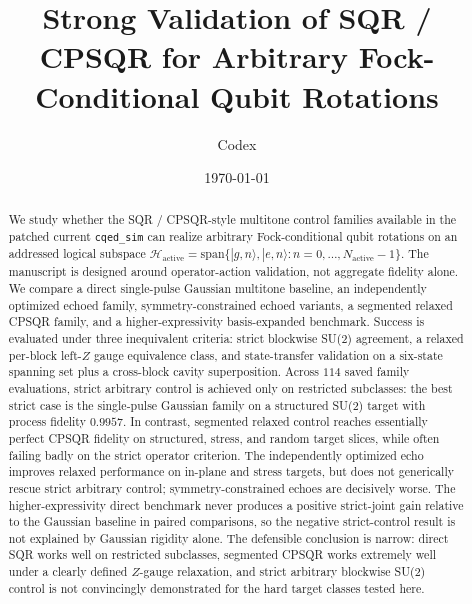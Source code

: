 \documentclass[aps,pra,twocolumn,reprint,floatfix,amsmath,amssymb]{revtex4-2}
\begin{document}
\title{Strong Validation of SQR / CPSQR for Arbitrary Fock-Conditional Qubit Rotations}
\author{Codex}
\date{\today}

\begin{abstract}
We study whether the SQR / CPSQR-style multitone control families available in the patched current \texttt{cqed\_sim} can realize arbitrary Fock-conditional qubit rotations on an addressed logical subspace
\(
\mathcal{H}_{\mathrm{active}}
=
\mathrm{span}\{ |g,n\rangle, |e,n\rangle : n=0,\dots,N_{\mathrm{active}}-1 \}.
\)
The manuscript is designed around operator-action validation, not aggregate fidelity alone.  We compare a direct single-pulse Gaussian multitone baseline, an independently optimized echoed family, symmetry-constrained echoed variants, a segmented relaxed CPSQR family, and a higher-expressivity basis-expanded benchmark.  Success is evaluated under three inequivalent criteria: strict blockwise SU(2) agreement, a relaxed per-block left-$Z$ gauge equivalence class, and state-transfer validation on a six-state spanning set plus a cross-block cavity superposition.  Across $114$ saved family evaluations, strict arbitrary control is achieved only on restricted subclasses: the best strict case is the single-pulse Gaussian family on a structured SU(2) target with process fidelity $0.9957$.  In contrast, segmented relaxed control reaches essentially perfect CPSQR fidelity on structured, stress, and random target slices, while often failing badly on the strict operator criterion.  The independently optimized echo improves relaxed performance on in-plane and stress targets, but does not generically rescue strict arbitrary control; symmetry-constrained echoes are decisively worse.  The higher-expressivity direct benchmark never produces a positive strict-joint gain relative to the Gaussian baseline in paired comparisons, so the negative strict-control result is not explained by Gaussian rigidity alone.  The defensible conclusion is narrow: direct SQR works well on restricted subclasses, segmented CPSQR works extremely well under a clearly defined $Z$-gauge relaxation, and strict arbitrary blockwise SU(2) control is not convincingly demonstrated for the hard target classes tested here.
\end{abstract}

\maketitle
\end{document}

